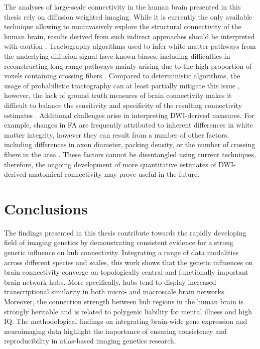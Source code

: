 The analyses of large-scale connectivity in the human brain presented in this thesis rely on diffusion weighted imaging. While it is currently the only available technique allowing to noninvasively explore the structural connectivity of the human brain, results derived from such indirect approaches should be interpreted with caution \citep{Jones2013,Sotiropoulos2017}. Tractography algorithms used to infer white matter pathways from the underlying diffusion signal have known biases, including difficulties in reconstructing long-range pathways \citep{Jones2010} mainly arising due to the high proportion of voxels containing crossing fibers \citep{Jeurissen2001}. Compared to deterministic algorithms, the usage of probabilistic tractography can at least partially mitigate this issue \citep{Tournier2010}, however, the lack of ground truth measures of brain connectivity makes it difficult to balance the sensitivity and specificity of the resulting connectivity estimates \citep{Zalesky2016}. Additional challenges arise in interpreting DWI-derived measures. For example, changes in FA are frequently attributed to inherent differences in white matter integrity, however they can result from a number of other factors, including differences in axon diameter, packing density, or the number of crossing fibers in the area \citep{Jones2013,Takahashi2002}. These factors cannot be disentangled using current techniques, therefore, the ongoing development of more quantitative estimates of DWI-derived anatomical connectivity \citep{Bouhrara2016,Zhang2012} may prove useful in the future.

\newpage
\section{Conclusions}

The findings presented in this thesis contribute towards the rapidly developing field of imaging genetics by demonstrating consistent evidence for a strong genetic influence on hub connectivity. Integrating a range of data modalities across different species and scales, this work shows that the genetic influences on brain connectivity converge on topologically central and functionally important brain network hubs. More specifically, hubs tend to display increased transcriptional similarity in both micro- and macroscale brain networks. Moreover, the connection strength between hub regions in the human brain is strongly heritable and is related to polygenic liability for mental illness and high IQ. The methodological findings on integrating brain-wide gene expression and neuroimaging data highlight the importance of ensuring consistency and reproducibility in atlas-based imaging genetics research.
